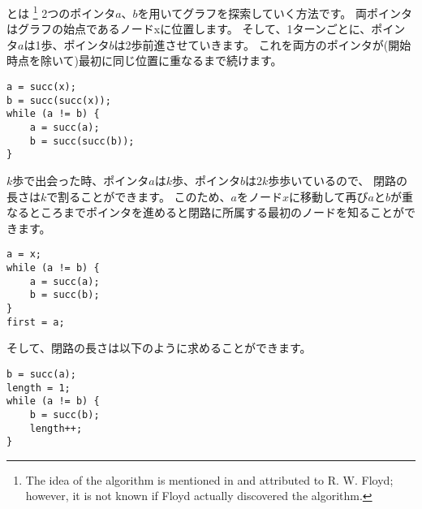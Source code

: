 とは
\footnote{The idea of the algorithm is mentioned in \cite{knu982}
and attributed to R. W. Floyd; however, it is not known if Floyd actually
discovered the algorithm.}
2つのポインタ$a$、$b$を用いてグラフを探索していく方法です。
両ポインタはグラフの始点であるノードxに位置します。
そして、1ターンごとに、ポインタ$a$は1歩、ポインタ$b$は2歩前進させていきます。
これを両方のポインタが(開始時点を除いて)最初に同じ位置に重なるまで続けます。

\begin{lstlisting}
a = succ(x);
b = succ(succ(x));
while (a != b) {
    a = succ(a);
    b = succ(succ(b));
}
\end{lstlisting}


$k$歩で出会った時、ポインタ$a$は$k$歩、ポインタ$b$は$2k$歩歩いているので、
閉路の長さは$k$で割ることができます。
このため、$a$をノード$x$に移動して再び$a$と$b$が重なるところまでポインタを進めると閉路に所属する最初のノードを知ることができます。

\begin{lstlisting}
a = x;
while (a != b) {
    a = succ(a);
    b = succ(b);
}
first = a;
\end{lstlisting}

そして、閉路の長さは以下のように求めることができます。
\begin{lstlisting}
b = succ(a);
length = 1;
while (a != b) {
    b = succ(b);
    length++;
}
\end{lstlisting}